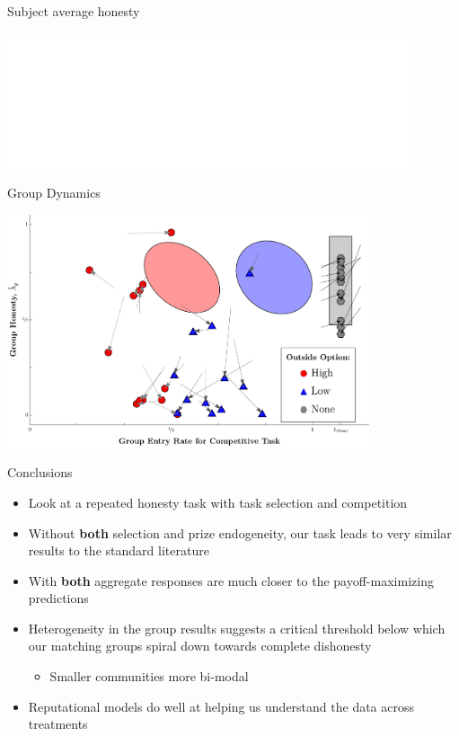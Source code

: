 \documentclass{beamer}
\begin{document}
\begin{frame}{Subject average honesty}
    \begin{center}
    	\includegraphics<1>[width=0.9\textwidth]{./ih/col_indivHonesty.pdf}
    \end{center}
\end{frame}

\begin{frame}{Group Dynamics}
    \begin{center}
    \includegraphics[width=0.8\textwidth]{./ih/col_Scatter_Group_WithArrowsEllipse.pdf}
    \end{center}
\end{frame}


\begin{frame}{Conclusions}
    \begin{itemize}
        \item Look at a repeated honesty task with task selection and competition
        \item Without \textbf{both} selection and prize endogeneity, our task leads
        to very similar results to the standard literature
        \item With \textbf{both} aggregate responses are much closer to the payoff-maximizing
        predictions
        \item Heterogeneity in the group results suggests a critical threshold below
        which our matching groups spiral down towards complete dishonesty
            \begin{itemize}
                \item Smaller communities more bi-modal
            \end{itemize}
        \item Reputational models do well at helping us understand the data across
        treatments
    \end{itemize}
\end{frame}
\end{document}
